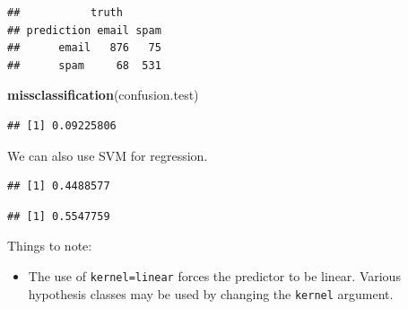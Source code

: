 \documentclass[]{book}
\newenvironment{Shaded}{\begin{snugshade}}{\end{snugshade}}
\newcommand{\KeywordTok}[1]{\textcolor[rgb]{0.13,0.29,0.53}{\textbf{#1}}}
\newcommand{\DataTypeTok}[1]{\textcolor[rgb]{0.13,0.29,0.53}{#1}}
\newcommand{\DecValTok}[1]{\textcolor[rgb]{0.00,0.00,0.81}{#1}}
\newcommand{\StringTok}[1]{\textcolor[rgb]{0.31,0.60,0.02}{#1}}
\newcommand{\CommentTok}[1]{\textcolor[rgb]{0.56,0.35,0.01}{\textit{#1}}}
\newcommand{\OperatorTok}[1]{\textcolor[rgb]{0.81,0.36,0.00}{\textbf{#1}}}
\newcommand{\NormalTok}[1]{#1}
\providecommand{\tightlist}{%
  \setlength{\itemsep}{0pt}\setlength{\parskip}{0pt}}
\theoremstyle{definition}
\theoremstyle{definition}
\theoremstyle{definition}
\theoremstyle{remark}
\begin{document}
\begin{verbatim}
##           truth
## prediction email spam
##      email   876   75
##      spam     68  531
\end{verbatim}

\begin{Shaded}
\begin{Highlighting}[]
\KeywordTok{missclassification}\NormalTok{(confusion.test)}
\end{Highlighting}
\end{Shaded}

\begin{verbatim}
## [1] 0.09225806
\end{verbatim}

We can also use SVM for regression.

\begin{Shaded}
\end{Shaded}

\begin{verbatim}
## [1] 0.4488577
\end{verbatim}

\begin{Shaded}
\end{Shaded}

\begin{verbatim}
## [1] 0.5547759
\end{verbatim}

Things to note:

\begin{itemize}
\tightlist
\item
  The use of \texttt{kernel=\textquotesingle{}linear\textquotesingle{}}
  forces the predictor to be linear. Various hypothesis classes may be
  used by changing the \texttt{kernel} argument.
\end{itemize}
\end{document}
